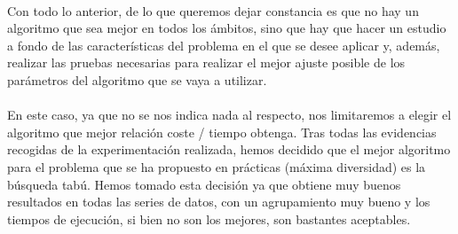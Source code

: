 	\paragraph{}Con todo lo anterior, de lo que queremos dejar constancia es que no hay un algoritmo que sea mejor en todos los ámbitos, sino que hay que hacer un estudio a fondo de las características del problema en el que se desee aplicar y, además, realizar las pruebas necesarias para realizar el mejor ajuste posible de los parámetros del algoritmo que se vaya a utilizar.
	
	\paragraph{}En este caso, ya que no se nos indica nada al respecto, nos limitaremos a elegir el algoritmo que mejor relación coste / tiempo obtenga. Tras todas las evidencias recogidas de la experimentación realizada, hemos decidido que el mejor algoritmo para el problema que se ha propuesto en prácticas (máxima diversidad) es la búsqueda tabú. Hemos tomado esta decisión ya que obtiene muy buenos resultados en todas las series de datos, con un agrupamiento muy bueno y los tiempos de ejecución, si bien no son los mejores, son bastantes aceptables.